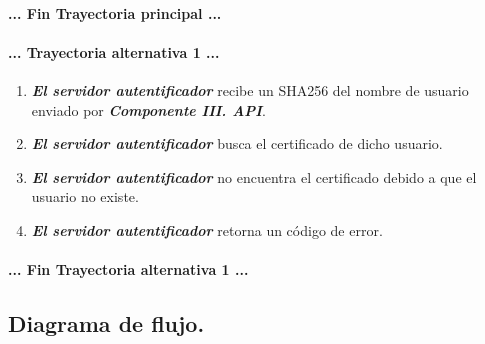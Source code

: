 \documentclass[12pt, a4paper, titlepage]{report}
\begin{document}
    		\paragraph{... Fin Trayectoria principal ...}
    		
    		\paragraph{... Trayectoria alternativa 1 ...}
    		    \begin{enumerate}
    		        \item \textbf{\textit{El servidor autentificador}} recibe un SHA256 del nombre de usuario enviado por \textbf{\textit{Componente III. API}}.
    		        
    		        \item \textbf{\textit{El servidor autentificador}} busca el certificado de dicho usuario.
    		        
    		        \item \textbf{\textit{El servidor autentificador}} no encuentra el certificado debido a que el usuario no existe.
    		        
    		        \item \textbf{\textit{El servidor autentificador}} retorna un código de error.
    		    \end{enumerate}
    		\paragraph{... Fin Trayectoria alternativa 1 ...}
    	    \newpage
	    
		    \subsection{Diagrama de flujo.}
		
\end{document}
